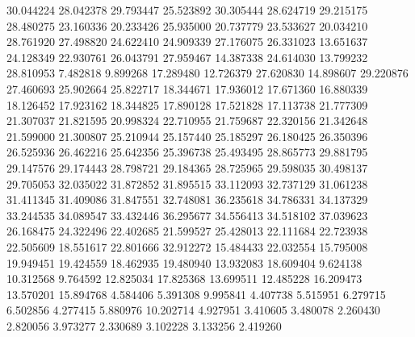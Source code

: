 30.044224
28.042378
29.793447
25.523892
30.305444
28.624719
29.215175
28.480275
23.160336
20.233426
25.935000
20.737779
23.533627
20.034210
28.761920
27.498820
24.622410
24.909339
27.176075
26.331023
13.651637
24.128349
22.930761
26.043791
27.959467
14.387338
24.614030
13.799232
28.810953
7.482818
9.899268
17.289480
12.726379
27.620830
14.898607
29.220876
27.460693
25.902664
25.822717
18.344671
17.936012
17.671360
16.880339
18.126452
17.923162
18.344825
17.890128
17.521828
17.113738
21.777309
21.307037
21.821595
20.998324
22.710955
21.759687
22.320156
21.342648
21.599000
21.300807
25.210944
25.157440
25.185297
26.180425
26.350396
26.525936
26.462216
25.642356
25.396738
25.493495
28.865773
29.881795
29.147576
29.174443
28.798721
29.184365
28.725965
29.598035
30.498137
29.705053
32.035022
31.872852
31.895515
33.112093
32.737129
31.061238
31.411345
31.409086
31.847551
32.748081
36.235618
34.786331
34.137329
33.244535
34.089547
33.432446
36.295677
34.556413
34.518102
37.039623
26.168475
24.322496
22.402685
21.599527
25.428013
22.111684
22.723938
22.505609
18.551617
22.801666
32.912272
15.484433
22.032554
15.795008
19.949451
19.424559
18.462935
19.480940
13.932083
18.609404
9.624138
10.312568
9.764592
12.825034
17.825368
13.699511
12.485228
16.209473
13.570201
15.894768
4.584406
5.391308
9.995841
4.407738
5.515951
6.279715
6.502856
4.277415
5.880976
10.202714
4.927951
3.410605
3.480078
2.260430
2.820056
3.973277
2.330689
3.102228
3.133256
2.419260
